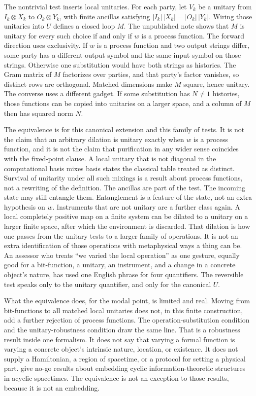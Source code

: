 \documentclass[12pt]{article}
\begin{document}
The nontrivial test inserts local unitaries. For each party, let \(V_k\) be a unitary from \(I_k\otimes X_k\) to \(O_k\otimes Y_k\), with finite ancillas satisfying \(|I_k|\,|X_k|=|O_k|\,|Y_k|\). Wiring those unitaries into \(U\) defines a closed loop \(M\). The unpublished note shows that \(M\) is unitary for every such choice if and only if \(w\) is a process function. The forward direction uses exclusivity. If \(w\) is a process function and two output strings differ, some party has a different output symbol and the same input symbol on those strings. Otherwise one substitution would have both strings as histories. The Gram matrix of \(M\) factorizes over parties, and that party's factor vanishes, so distinct rows are orthogonal. Matched dimensions make \(M\) square, hence unitary. The converse uses a different gadget. If some substitution has \(N\neq 1\) histories, those functions can be copied into unitaries on a larger space, and a column of \(M\) then has squared norm \(N\).

The equivalence is for this canonical extension and this family of tests. It is not the claim that an arbitrary dilation is unitary exactly when \(w\) is a process function, and it is not the claim that purification in any wider sense coincides with the fixed-point clause. A local unitary that is not diagonal in the computational basis mixes basis states the classical table treated as distinct. Survival of unitarity under all such mixings is a result about process functions, not a rewriting of the definition. The ancillas are part of the test. The incoming state may still entangle them. Entanglement is a feature of the state, not an extra hypothesis on \(w\). Instruments that are not unitary are a further class again. A local completely positive map on a finite system can be dilated to a unitary on a larger finite space, after which the environment is discarded. That dilation is how one passes from the unitary tests to a larger family of operations. It is not an extra identification of those operations with metaphysical ways a thing can be. An assessor who treats ``we varied the local operation'' as one gesture, equally good for a bit-function, a unitary, an instrument, and a change in a concrete object's nature, has used one English phrase for four quantifiers. The reversible test speaks only to the unitary quantifier, and only for the canonical \(U\).

What the equivalence does, for the modal point, is limited and real. Moving from bit-functions to all matched local unitaries does not, in this finite construction, add a further rejection of process functions. The operation-substitution condition and the unitary-robustness condition draw the same line. That is a robustness result inside one formalism. It does not say that varying a formal function is varying a concrete object's intrinsic nature, location, or existence. It does not supply a Hamiltonian, a region of spacetime, or a protocol for setting a physical part. \citet{vilasini2024} give no-go results about embedding cyclic information-theoretic structures in acyclic spacetimes. The equivalence is not an exception to those results, because it is not an embedding.
\end{document}
